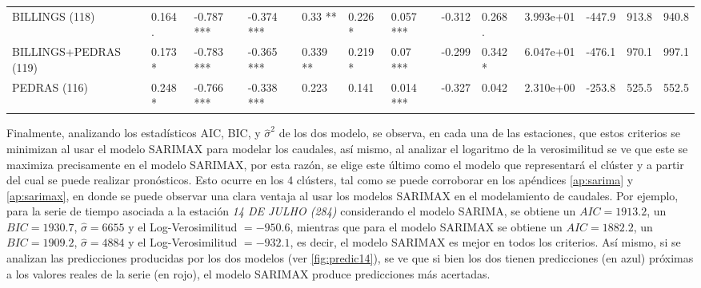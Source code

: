 \documentclass[12pt,oneside]{book}\usepackage[]{graphicx}\usepackage[]{color}
\newenvironment{knitrout}{}{} %
\theoremstyle{definition} %
\begin{document}
\begin{knitrout}
\begin{landscape}
\begin{table}
{\begin{tabular}[t]{lllllllllrrrr}
\rowcolor{gray!6}  BILLINGS (118) & 0.164 . & -0.787 *** & -0.374 *** & 0.33 ** & 0.226 * & 0.057 *** & -0.312 & 0.268 . & 3.993e+01 & -447.9 & 913.8 & 940.8\\
BILLINGS+PEDRAS (119) & 0.173 * & -0.783 *** & -0.365 *** & 0.339 ** & 0.219 * & 0.07 *** & -0.299 & 0.342 * & 6.047e+01 & -476.1 & 970.1 & 997.1\\
\addlinespace
\rowcolor{gray!6}  PEDRAS (116) & 0.248 * & -0.766 *** & -0.338 *** & 0.223 & 0.141 & 0.014 *** & -0.327 & 0.042 & 2.310e+00 & -253.8 & 525.5 & 552.5\\
\bottomrule
\end{tabular}}
\end{table}
\end{landscape}


\end{knitrout}


Finalmente, analizando los estadísticos AIC, BIC, y $\hat\sigma^2$ de los dos modelo, se observa, en cada una de las estaciones, que estos criterios se minimizan al usar el modelo SARIMAX para modelar los caudales, así mismo, al analizar el logaritmo de la verosimilitud se ve que este se maximiza precisamente en el modelo SARIMAX, por esta razón, se elige este último como el modelo que representará el clúster y a partir del cual se puede realizar pronósticos. Esto ocurre en los 4 clústers, tal como se puede corroborar en los apéndices \ref{ap:sarima} y \ref{ap:sarimax}, en donde se puede observar una clara ventaja al usar los modelos SARIMAX en el modelamiento de caudales. Por ejemplo, para la serie de tiempo asociada a la estación \textit{14 DE JULHO (284)} considerando el modelo SARIMA, se obtiene un $AIC = 1913.2$, un $BIC=1930.7$, $\hat\sigma = 6655 $ y el Log-Verosimilitud $= -950.6$, mientras que para el modelo SARIMAX se obtiene un $AIC = 1882.2$, un $BIC=1909.2$, $\hat\sigma = 4884 $ y el Log-Verosimilitud $=-932.1$, es decir, el modelo SARIMAX es mejor en todos los criterios. Así mismo, si se analizan las predicciones producidas por los dos modelos (ver \ref{fig:predic14}), se ve que si bien los dos tienen predicciones (en azul) próximas a los valores reales de la serie (en rojo), el modelo SARIMAX produce predicciones más acertadas.
\end{document}
